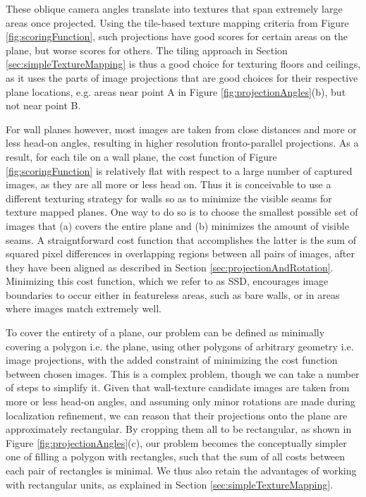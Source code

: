 \documentclass[10pt,twocolumn,letterpaper]{article}
\begin{document}
These oblique camera angles translate into textures that span
extremely large areas once projected. Using the tile-based texture
mapping criteria from Figure \ref{fig:scoringFunction}, such
projections have good scores for certain areas on the plane, but worse
scores for others. The tiling approach in Section
\ref{sec:simpleTextureMapping} is thus a good choice for texturing
floors and ceilings, as it uses the parts of image projections that
are good choices for their respective plane locations, e.g. areas near
point A in Figure \ref{fig:projectionAngles}(b), but not near point B.

For wall planes however, most images are taken from close distances
and more or less head-on angles, resulting in higher resolution
fronto-parallel projections. As a result, for each tile on a wall
plane, the cost function of Figure \ref{fig:scoringFunction} is
relatively flat with respect to a large number of captured images, as
they are all more or less head on. Thus it is conceivable to use a
different texturing strategy for walls so as to minimize the visible
seams for texture mapped planes. One way to do so is to choose the
smallest possible set of images that (a) covers the entire plane and
(b) minimizes the amount of visible seams. A straigntforward cost
function that accomplishes the latter is the sum of squared pixel
differences in overlapping regions between all pairs of images, after
they have been aligned as described in Section
\ref{sec:projectionAndRotation}. Minimizing this cost function, which
we refer to as SSD, encourages image boundaries to occur either in
featureless areas, such as bare walls, or in areas where images match
extremely well.

To cover the entirety of a plane, our problem can be defined as
minimally covering a polygon i.e. the plane, using other polygons of
arbitrary geometry i.e. image projections, with the added constraint
of minimizing the cost function between chosen images.  This is a
complex problem, though we can take a number of steps to simplify
it. Given that wall-texture candidate images are taken from more or
less head-on angles, and assuming only minor rotations are made during
localization refinement, we can reason that their projections onto the
plane are approximately rectangular. By cropping them all to be
rectangular, as shown in Figure \ref{fig:projectionAngles}(c), our
problem becomes the conceptually simpler one of filling a polygon with
rectangles, such that the sum of all costs between each pair of
rectangles is minimal. We thus also retain the advantages of working
with rectangular units, as explained in Section
\ref{sec:simpleTextureMapping}.
\end{document}
